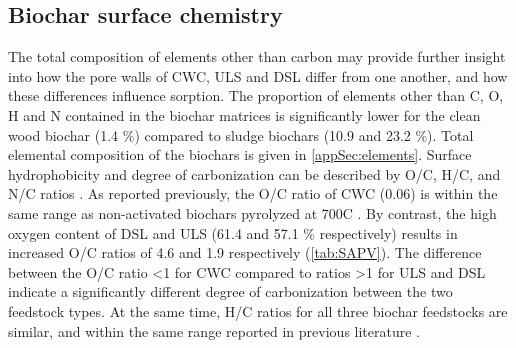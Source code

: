 \subsection{Biochar surface chemistry}
The total composition of elements other than carbon may provide further insight into how the pore walls of CWC, ULS and DSL differ from one another, and how these differences influence sorption. The proportion of elements other than C, O, H and N contained in the biochar matrices is significantly lower for the clean wood biochar (1.4 \%) compared to sludge biochars (10.9 and 23.2 \%). Total elemental composition of the biochars is given in \cref{appSec:elements}. Surface hydrophobicity and degree of carbonization can be described by O/C, H/C, and N/C ratios \citep{chun2004compositions}. As reported previously, the O/C ratio of CWC (0.06) is within the same range as non-activated biochars pyrolyzed at 700\textdegree C \citep{LehmannAndJoseph2015, chun2004compositions,kupryianchyk2016biochar}. By contrast, the high oxygen content of DSL and ULS (61.4 and 57.1 \% respectively) results in increased O/C ratios of 4.6 and 1.9 respectively (\cref{tab:SAPV}). The difference between the O/C ratio \textless 1 for CWC compared to ratios \textgreater 1 for ULS and DSL indicate a significantly different degree of carbonization between the two feedstock types. At the same time, H/C ratios for all three biochar feedstocks are similar, and within the same range reported in previous literature \citep{chun2004compositions,kupryianchyk2016biochar}. 

